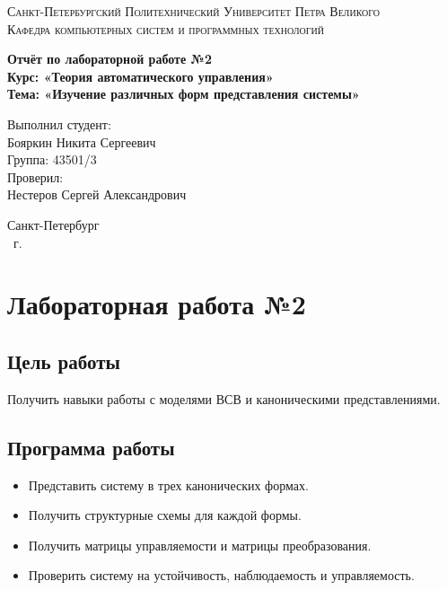 \documentclass[14pt,a4paper,report]{report}
\begin{document}
\def\contentsname{Содержание}

\begin{titlepage}
	\begin{center}
		\textsc{Санкт-Петербургский Политехнический 
			Университет Петра Великого\\[5mm]
			Кафедра компьютерных систем и программных технологий}
		
		\vfill
		
		\textbf{Отчёт по лабораторной работе №2\\[3mm]
			Курс: «Теория автоматического управления»\\[3mm]
			Тема: «Изучение различных форм представления системы»\\[35mm]
			}
	\end{center}
	
	\hfill
	\begin{minipage}{.5\textwidth}
		Выполнил студент:\\[2mm] 
		Бояркин Никита Сергеевич\\
		Группа: 43501/3\\[5mm]
		
		Проверил:\\[2mm] 
		Нестеров Сергей Александрович
	\end{minipage}
	\vfill
	\begin{center}
		Санкт-Петербург\\ \the\year\ г.
	\end{center}
\end{titlepage}

\tableofcontents
\clearpage

\chapter{Лабораторная работа №2}

\section{Цель работы}

Получить навыки работы с моделями ВСВ и каноническими представлениями.

\section{Программа работы}

\begin{itemize}
	\item Представить систему в трех канонических формах.
	\item Получить структурные схемы для каждой формы.
	\item Получить матрицы управляемости и матрицы преобразования.
	\item Проверить систему на устойчивость, наблюдаемость и управляемость.
\end{itemize}
\end{document}

